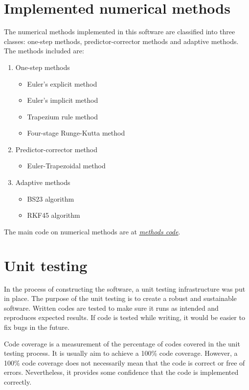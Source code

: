 \section{Implemented numerical methods}
\label{sec:implemented-methods}
The numerical methods implemented in this software are classified into three classes: one-step methods, predictor-corrector methods and adaptive methods. The methods included are:
\begin{enumerate}
    \item One-step methods
    \begin{itemize}
        \item Euler's explicit method
        \item Euler's implicit method
        \item Trapezium rule method
        \item Four-stage Runge-Kutta method
    \end{itemize}
    \item Predictor-corrector method
    \begin{itemize}
        \item Euler-Trapezoidal method
    \end{itemize}
    \item Adaptive methods
    \begin{itemize}
        \item BS23 algorithm
        \item RKF45 algorithm
    \end{itemize}
\end{enumerate}

The main code on numerical methods are at \href{https://github.com/FarmHJ/numerical-solver/blob/main/solver/methods.py}{\underline{\emph{methods code}}}.

\section{Unit testing}
\label{sec:testing}
In the process of constructing the software, a unit testing infrastructure was put in place. The purpose of the unit testing is to create a robust and sustainable software. Written codes are tested to make sure it runs as intended and reproduces expected results. If code is tested while writing, it would be easier to fix bugs in the future. 

Code coverage is a measurement of the percentage of codes covered in the unit testing process. It is usually aim to achieve a 100\% code coverage. However, a 100\% code coverage does not necessarily mean that the code is correct or free of errors. Nevertheless, it provides some confidence that the code is implemented correctly.


